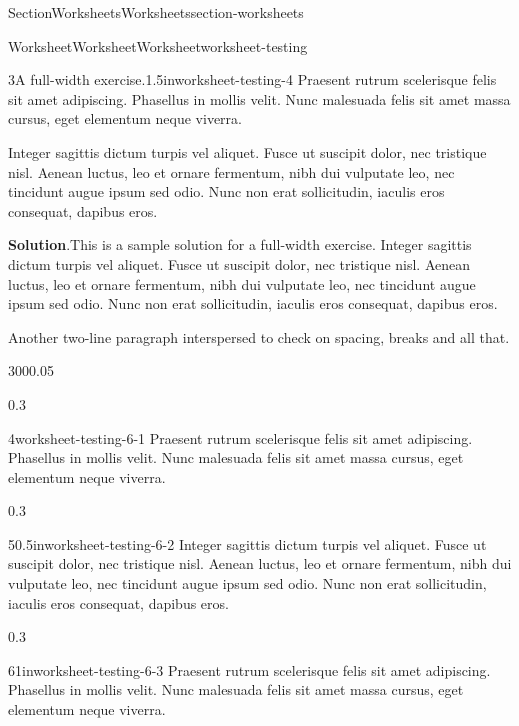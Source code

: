 \documentclass[oneside,10pt,]{article}
\newcommand{\blocktitlefont}{\relax}
\numberwithin{equation}{section}
\begin{document}
\begin{sectionptx}{Section}{Worksheets}{}{Worksheets}{}{}{section-worksheets}
\begin{worksheet-subsection}{Worksheet}{Worksheet}{}{Worksheet}{}{}{worksheet-testing}
\begin{divisionexercise}{3}{A full-width exercise.}{1.5in}{worksheet-testing-4}%
Praesent rutrum scelerisque felis sit amet adipiscing. Phasellus in mollis velit. Nunc malesuada felis sit amet massa cursus, eget elementum neque viverra.%
\par
Integer sagittis dictum turpis vel aliquet. Fusce ut suscipit dolor, nec tristique nisl. Aenean luctus, leo et ornare fermentum, nibh dui vulputate leo, nec tincidunt augue ipsum sed odio. Nunc non erat sollicitudin, iaculis eros consequat, dapibus eros.%
\par\smallskip%
\noindent\textbf{\blocktitlefont Solution}.\hypertarget{worksheet-testing-4-3}{}\quad{}This is a sample solution for a full-width exercise.  Integer sagittis dictum turpis vel aliquet. Fusce ut suscipit dolor, nec tristique nisl. Aenean luctus, leo et ornare fermentum, nibh dui vulputate leo, nec tincidunt augue ipsum sed odio. Nunc non erat sollicitudin, iaculis eros consequat, dapibus eros.%
\end{divisionexercise}%
Another two-line paragraph interspersed to check on spacing, breaks and all that.%
\begin{sidebyside}{3}{0}{0}{0.05}%
\begin{sbspanel}{0.3}%
\begin{divisionexercise}{4}{}{}{worksheet-testing-6-1}%
Praesent rutrum scelerisque felis sit amet adipiscing. Phasellus in mollis velit. Nunc malesuada felis sit amet massa cursus, eget elementum neque viverra.%
\end{divisionexercise}%
\end{sbspanel}%
\begin{sbspanel}{0.3}%
\begin{divisionexercise}{5}{}{0.5in}{worksheet-testing-6-2}%
Integer sagittis dictum turpis vel aliquet. Fusce ut suscipit dolor, nec tristique nisl. Aenean luctus, leo et ornare fermentum, nibh dui vulputate leo, nec tincidunt augue ipsum sed odio. Nunc non erat sollicitudin, iaculis eros consequat, dapibus eros.%
\end{divisionexercise}%
\end{sbspanel}%
\begin{sbspanel}{0.3}%
\begin{divisionexercise}{6}{}{1in}{worksheet-testing-6-3}%
Praesent rutrum scelerisque felis sit amet adipiscing. Phasellus in mollis velit. Nunc malesuada felis sit amet massa cursus, eget elementum neque viverra.%
\end{divisionexercise}%

\end{sbspanel}
\end{sidebyside}
\end{worksheet-subsection}
\end{sectionptx}
\end{document}
